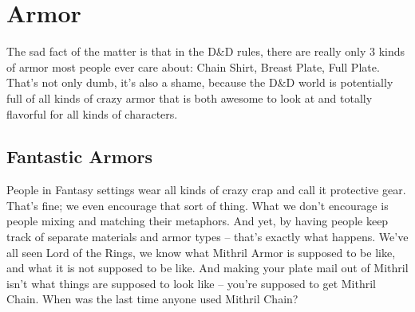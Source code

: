\renewcommand{\minitabular}[1]{\begin{tabular}{p{0.25in}p{2.9in}} #1\\ \end{tabular}\\}
\newcommand{\skillarmor}[7]{\noindent \minitabular{\multicolumn{2}{l}{\textbf{#1}}}  \minitabular{\multicolumn{2}{l}{\parbox{3.3in}{\small #2}}} \minitabular{\multicolumn{2}{l}{\small \textbf{#3}}} \minitabular{\raggedleft\textbf{\small 4:} & {\small #4}} \minitabular{\raggedleft\textbf{\small 8:} & {\small #5}} \minitabular{\raggedleft\textbf{\small 13:} & {\small #6}} \minitabular{\raggedleft\textbf{\small 18:} &{\small #7}}\vspace*{-6pt}}
\newcommand{\attackarmor}[7]{\noindent\minitabular{\multicolumn{2}{l}{\textbf{#1}}} \minitabular{\multicolumn{2}{l}{\parbox{3.3in}{\small #2}}} \minitabular{\multicolumn{2}{l}{\small \textbf{#3}}} \minitabular{\raggedleft\textbf{\small +1:} & {\small #4}} \minitabular{\raggedleft\textbf{\small +5:} & {\small #5}} \minitabular{\raggedleft\textbf{\small +10:} & {\small #6}} \minitabular{\raggedleft\textbf{\small +15:} &{\small #7}}\vspace*{-6pt}}

\section{Armor}

The sad fact of the matter is that in the D\&D rules, there are really only 3 kinds of armor most people ever care about: Chain Shirt, Breast Plate, Full Plate. That's not only dumb, it's also a shame, because the D\&D world is potentially full of all kinds of crazy armor that is both awesome to look at and totally flavorful for all kinds of characters.

\subsection{Fantastic Armors}
\vspace*{-8pt}

People in Fantasy settings wear all kinds of crazy crap and call it protective gear. That's fine; we even encourage that sort of thing. What we don't encourage is people mixing and matching their metaphors. And yet, by having people keep track of separate materials and armor types -- that's exactly what happens. We've all seen Lord of the Rings, we know what Mithril Armor is supposed to be like, and what it is not supposed to be like. And making your plate mail out of Mithril isn't what things are supposed to look like -- you're supposed to get Mithril Chain. When was the last time anyone used Mithril Chain?

